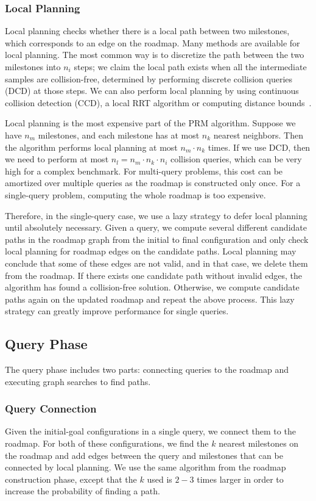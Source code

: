 \subsubsection{Local Planning}
Local planning checks whether there is a local path between two milestones, which corresponds to an edge on the roadmap. Many methods are available for local planning. The most common way is to discretize the path between the two milestones into $n_i$ steps; we claim the local path exists when all the intermediate samples are collision-free, determined by performing discrete collision queries (DCD) at those steps. We can also perform local planning by using continuous collision detection (CCD), a local RRT algorithm or computing distance bounds~\cite{Schwarzer05}.

Local planning is the most expensive part of the PRM algorithm. Suppose we have $n_m$ milestones, and each milestone has at most $n_k$ nearest neighbors. Then the algorithm performs local planning at most $n_m \cdot n_k$ times. If we use DCD, then we need to perform at most $n_l = n_m \cdot n_k \cdot n_i$ collision queries, which can be very high for a complex benchmark.
For multi-query problems, this cost can be amortized over multiple queries as the roadmap is constructed only once. For a single-query problem, computing the whole roadmap is too expensive.

Therefore, in the single-query case, we use a lazy strategy to defer local planning until absolutely necessary.
Given a query, we compute several different candidate paths in the roadmap graph from the initial to final configuration and only check local planning for roadmap edges on the candidate paths. Local planning may conclude that some of these edges are not valid, and in that case, we delete them from the roadmap. If there exists one candidate path without invalid edges, the algorithm has found a collision-free solution. Otherwise, we compute candidate paths again on the updated roadmap and repeat the above process. This lazy strategy can greatly improve performance for single queries.

\subsection{Query Phase}
The query phase includes two parts: connecting queries to the roadmap and executing graph searches to find paths.
\subsubsection{Query Connection}
Given the initial-goal configurations in a single query, we connect them to the roadmap. For both of these configurations, we find the $k$ nearest milestones on the roadmap and add edges between the query and milestones that can be connected by local planning. We use the same algorithm from the roadmap construction phase, except that the $k$ used is $2-3$ times larger in order to increase the probability of finding a path.

